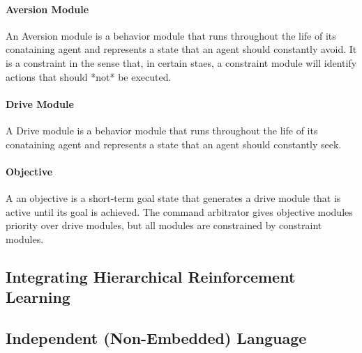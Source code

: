 \paragraph{Aversion Module}

An Aversion module is a behavior module that runs throughout the life
of its conataining agent and represents a state that an agent should
constantly avoid.  It is a constraint in the sense that, in certain
staes, a constraint module will identify actions that should *not* be
executed.

\paragraph{Drive Module}

A Drive module is a behavior module that runs throughout the life of
its conataining agent and represents a state that an agent should
constantly seek.

\paragraph{Objective}

A an objective is a short-term goal state that generates a drive module that is active until its goal is achieved.  The command arbitrator gives objective modules priority over drive modules, but all modules are constrained by constraint modules.

\subsection{Integrating Hierarchical Reinforcement Learning}

\subsection{Independent (Non-Embedded) Language}\label{sec:conclusion-full-language}
